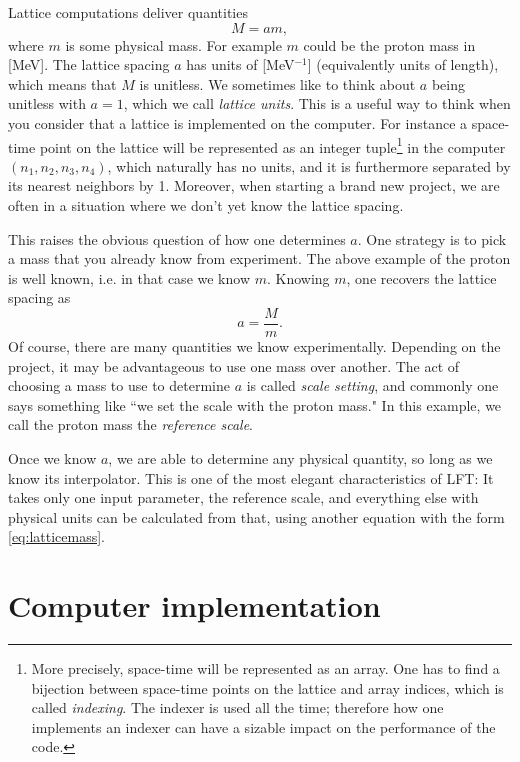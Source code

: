Lattice computations deliver quantities
\begin{equation}\label{eq:latticemass}
M=am,
\end{equation} 
where
$m$ is some physical mass. For example $m$ could be the proton mass in [MeV].
The lattice spacing $a$ has units of [MeV$^{-1}$] (equivalently units of
length), which means that $M$ is unitless. We sometimes like to 
think about $a$ being unitless with $a=1$, which we call
{\it lattice units}. This is a useful way to think
when you consider that a lattice is implemented on the computer. For
instance a space-time point on the lattice will be represented as an integer
tuple\footnote{More precisely, space-time will be represented as an array. One
has to find a bijection between space-time points on the lattice and array
indices, which is called {\it indexing}. The indexer is used all
the time; therefore how one implements an indexer can have a sizable impact on
the performance of the code.} in the computer $(n_1,n_2,n_3,n_4)$, 
which naturally has no units, and it
is furthermore separated by its nearest neighbors by 1.
Moreover, when starting a brand new project, we are often in a situation where
we don't yet know the lattice spacing.

This raises the obvious question of how one determines $a$. One strategy is to
pick a mass that you already know from experiment. The above example of the
proton is well known, i.e. in that case we know $m$. Knowing $m$, one recovers
the lattice spacing as
\begin{equation}
a=\frac{M}{m}.
\end{equation}
Of course, there are many quantities we know experimentally. Depending on the
project, it may be advantageous to use one mass over another. The act of
choosing a mass to use to determine $a$ is called {\it scale
setting},  
and commonly one says something like ``we set the scale with the proton mass."
In this example, we call the proton mass the {\it reference
scale}.

Once we know $a$, we are able to determine any physical quantity, so long as we
know its interpolator. This is one of the most elegant characteristics of LFT:
It takes only one input parameter, the reference scale, and everything else
with physical units can be calculated from that, using another equation with the
form \eqref{eq:latticemass}.



\section{Computer implementation}

